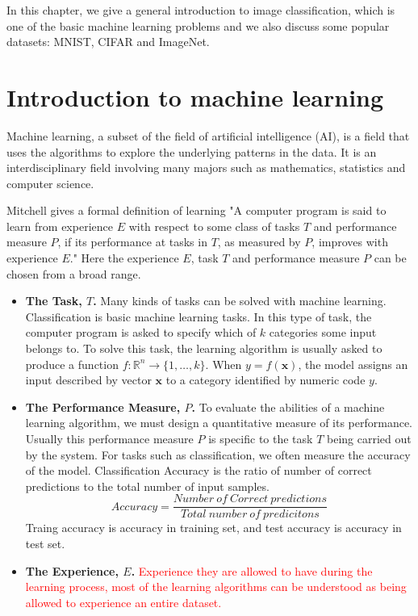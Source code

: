 In this chapter, we give a general introduction to image classification, which is one of the basic machine learning problems and we also discuss some popular datasets: MNIST, CIFAR and ImageNet.

\section{Introduction to machine learning}
Machine learning, a subset of the field of artificial intelligence (AI), is a field that uses the algorithms to explore the underlying patterns in the data. It is an interdisciplinary field involving many majors such as mathematics, statistics and computer science.

Mitchell \cite{mitchell1997machine} gives a formal definition of learning "A computer program is said to learn from experience $E$ with respect to some class of tasks $T$ and performance measure $P$, if its performance at tasks in $T$, as measured by $P$, improves with experience $E$." Here the experience $E$, task $T$ and performance measure $P$ can be chosen from a broad range.

\begin{itemize}
\item \textbf{The Task, $T$.}
Many kinds of tasks can be solved with machine learning. Classification is basic machine learning tasks.
In this type of task, the computer program is asked to specify which of $k$ categories some input belongs to. To solve this task, the learning algorithm is usually asked to produce a function $f: \mathbb{R}^{n} \rightarrow\{1, \ldots, k\}$. When $y=f(\boldsymbol{x})$, the model assigns an input described by vector $\boldsymbol{x}$ to a category identified by numeric code $y$.
\item \textbf{The Performance Measure, $P$.}
To evaluate the abilities of a machine learning algorithm, we must design a quantitative measure of its performance. Usually this performance measure $P$ is specific to the task $T$ being carried out by the system. For tasks such as classification, we often measure the accuracy of the model.  Classification Accuracy is the ratio of number of correct predictions to the total number of input samples.
\begin{equation}
Accuracy = \frac{Number~of~Correct~predictions}{Total~number~of~predicitons}
\end{equation}
Traing accuracy is accuracy in training set, and test accuracy is accuracy in test set.

\item \textbf{The Experience, $E$.}
\textcolor{red}{Experience they are allowed to have during the learning process, most of the learning algorithms can be understood as being allowed to experience an entire dataset.}
\end{itemize}

